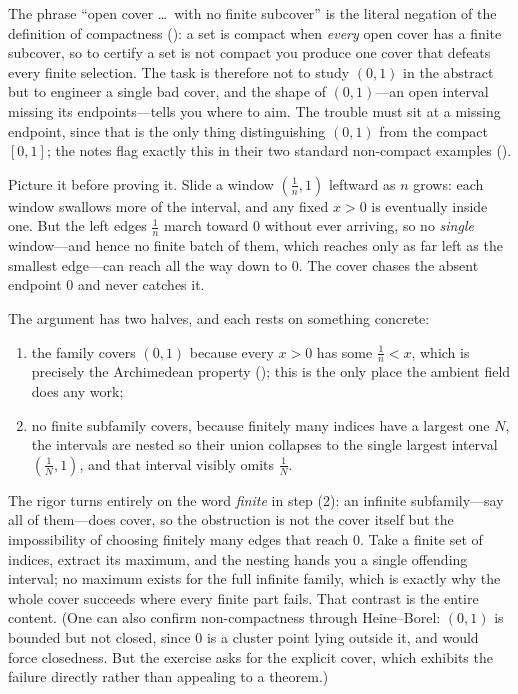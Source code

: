 \documentclass[main.tex]{subfiles}
\begin{document}
\begin{Reflection}
The phrase ``open cover \ldots\ with no finite subcover'' is the literal negation of the definition of
compactness (): a set is compact when \emph{every} open cover has a finite subcover, so
to certify a set is not compact you produce one cover that defeats every finite selection. The task is
therefore not to study $(0,1)$ in the abstract but to engineer a single bad cover, and the shape of
$(0,1)$---an open interval missing its endpoints---tells you where to aim. The trouble must sit at a
missing endpoint, since that is the only thing distinguishing $(0,1)$ from the compact $[0,1]$; the
notes flag exactly this in their two standard non-compact examples ().

Picture it before proving it. Slide a window $(\tfrac1n,1)$ leftward as $n$ grows: each window swallows
more of the interval, and any fixed $x>0$ is eventually inside one. But the left edges $\tfrac1n$ march
toward $0$ without ever arriving, so no \emph{single} window---and hence no finite batch of them, which
reaches only as far left as the smallest edge---can reach all the way down to $0$. The cover chases the
absent endpoint $0$ and never catches it.

The argument has two halves, and each rests on something concrete:
\begin{enumerate}[leftmargin=1.7em,itemsep=3pt,topsep=2pt,label=\textnormal{(\arabic*)}]
  \item the family covers $(0,1)$ because every $x>0$ has some $\tfrac1n<x$, which is precisely the
        Archimedean property (); this is the only place the
        ambient field does any work;
  \item no finite subfamily covers, because finitely many indices have a largest one $N$, the intervals
        are nested so their union collapses to the single largest interval $(\tfrac1N,1)$, and that
        interval visibly omits $\tfrac1N$.
\end{enumerate}

The rigor turns entirely on the word \emph{finite} in step (2): an infinite subfamily---say all of
them---does cover, so the obstruction is not the cover itself but the impossibility of choosing finitely
many edges that reach $0$. Take a finite set of indices, extract its maximum, and the nesting hands you
a single offending interval; no maximum exists for the full infinite family, which is exactly why the
whole cover succeeds where every finite part fails. That contrast is the entire content. (One can also
confirm non-compactness through Heine--Borel: $(0,1)$ is bounded but not closed, since $0$ is a cluster
point lying outside it, and  would force closedness. But the exercise asks for the explicit cover, which exhibits the
failure directly rather than appealing to a theorem.)


\end{Reflection}
\end{document}
